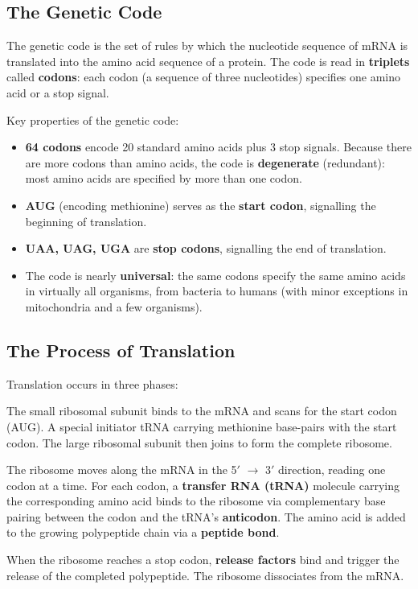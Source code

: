 \subsection{The Genetic Code}
\label{subsec:molbio:genetic-code}

The genetic code is the set of rules by which the nucleotide sequence of mRNA is translated into the amino acid sequence of a protein. The code is read in \textbf{triplets} called \textbf{codons}: each codon (a sequence of three nucleotides) specifies one amino acid or a stop signal.

Key properties of the genetic code:
\begin{itemize}[itemsep=2pt]
  \item \textbf{64 codons} encode 20 standard amino acids plus 3 stop signals. Because there are more codons than amino acids, the code is \textbf{degenerate} (redundant): most amino acids are specified by more than one codon.
  \item \textbf{AUG} (encoding methionine) serves as the \textbf{start codon}, signalling the beginning of translation.
  \item \textbf{UAA, UAG, UGA} are \textbf{stop codons}, signalling the end of translation.
  \item The code is nearly \textbf{universal}: the same codons specify the same amino acids in virtually all organisms, from bacteria to humans (with minor exceptions in mitochondria and a few organisms).
\end{itemize}

\subsection{The Process of Translation}
\label{subsec:molbio:translation-process}

Translation occurs in three phases:

\begin{description}[style=nextline, itemsep=3pt]
  \item[Initiation] The small ribosomal subunit binds to the mRNA and scans for the start codon (AUG). A special initiator tRNA carrying methionine base-pairs with the start codon. The large ribosomal subunit then joins to form the complete ribosome.

  \item[Elongation] The ribosome moves along the mRNA in the 5$'${} $\rightarrow$ 3$'${} direction, reading one codon at a time. For each codon, a \textbf{transfer RNA (tRNA)} molecule carrying the corresponding amino acid binds to the ribosome via complementary base pairing between the codon and the tRNA's \textbf{anticodon}. The amino acid is added to the growing polypeptide chain via a \textbf{peptide bond}.

  \item[Termination] When the ribosome reaches a stop codon, \textbf{release factors} bind and trigger the release of the completed polypeptide. The ribosome dissociates from the mRNA.
\end{description}

